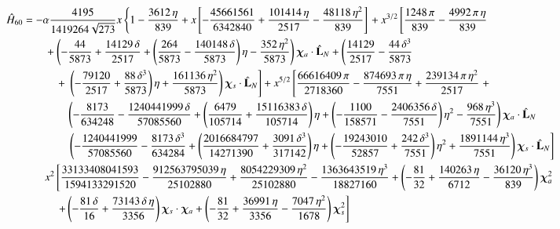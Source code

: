 \documentclass[prd,preprintnumbers,twocolumn,eqsecnum,floatfix,letter]{revtex4}
\begin{document}
\begin{widetext}
\begin{subequations}
\begin{align}\label{eq:H60}
	\hat{H}_{60} &=-\alpha\frac{4195}{1419264\sqrt{273}}x\left\{1-\frac{3612\,\eta}{839}+ x\left[-\frac{45661561}{6342840} + \frac{101414\,\eta}{2517} - \frac{48118\,\eta^2}{839}\right]\right. + x^{3/2} \left[\frac{1248\,\pi}{839} -\frac{4992\,\pi\,\eta}{839}\right.\nonumber\\
	&\qquad + \left(-\frac{44}{5873} + \frac{14129\,\delta}{2517} + \left(\frac{264}{5873} - \frac{140148\,\delta}{5873}\right)\eta -\frac{352\,\eta^2}{5873}\right)\bm{\chi}_a \cdot \hat{\mathbf{L}}_N + \left(\frac{14129}{2517} -\frac{44\,\delta^3}{5873}\right.\nonumber\\
	&\quad\qquad + \left.\left.\left(-\frac{79120}{2517} + \frac{88\,\delta^3}{5873}\right)\eta + \frac{161136\,\eta^2}{5873}\right)\bm{\chi}_s \cdot \hat{\mathbf{L}}_N\right] + x^{5/2}\left[\frac{66616409\,\pi}{2718360} -\frac{874693\,\pi\,\eta}{7551} + \frac{239134\,\pi\,\eta^2}{2517}\right. + \nonumber\\
	&\qquad\qquad \left(-\frac{8173}{634248} -\frac{1240441999\,\delta}{57085560} + \left(\frac{6479}{105714} + \frac{15116383\,\delta}{105714}\right)\eta + \left(-\frac{1100}{158571}-\frac{2406356\,\delta}{7551}\right)\eta^2-\frac{968\,\eta^3}{7551}\right)\bm{\chi}_a \cdot \hat{\mathbf{L}}_N\nonumber\\
	&\qquad\qquad \left. \left(-\frac{1240441999}{57085560} -\frac{8173\,\delta^3}{634284} + \left(\frac{2016684797}{14271390} + \frac{3091\,\delta^3}{317142}\right)\eta + \left(-\frac{19243010}{52857} + \frac{242\,\delta^3}{7551}\right)\eta^2 + \frac{1891144\,\eta^3}{7551}\right)\bm{\chi}_s \cdot \hat{\mathbf{L}}_N\right]\nonumber\\
	&\qquad x^2\left[\frac{33133408041593}{1594133291520}-\frac{912563795039\,\eta}{25102880} + \frac{8054229309\,\eta^2}{25102880}-\frac{1363643519\,\eta^3}{18827160} + \left(-\frac{81}{32} + \frac{140263\,\eta}{6712}-\frac{36120\,\eta^3}{839}\right)\bm{\chi}_a^2\right. \nonumber\\
	& \quad\qquad \left.+ \left(-\frac{81\,\delta}{16} + \frac{73143\,\delta\,\eta}{3356}\right)\bm{\chi}_s \cdot \bm{\chi}_a + \left(-\frac{81}{32} + \frac{36991\,\eta}{3356} - \frac{7047\,\eta^2}{1678}\right)\bm{\chi}_s^2\right]
\end{align}


\end{subequations}
\end{widetext}
\end{document}
